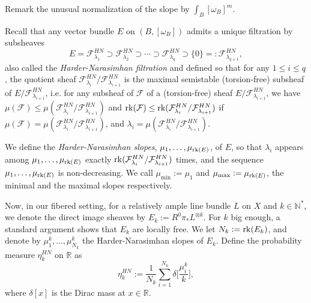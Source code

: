 \documentclass[12pt]{article}
\numberwithin{equation}{section}
\theoremstyle{theorem}
\theoremstyle{definition}
\theoremstyle{remark}
\newcommand{\real}{\mathbb{R}}
\newcommand{\nat}{\mathbb{N}}
\newcommand{\rk}[1]{{\rm{rk}} ( #1 )}
\begin{document}
	Remark the unusual normalization of the slope by $\int_B [\omega_B]^m$.
	\par 
	Recall that any vector bundle $E$ on $(B, [\omega_B])$ admits a unique filtration by subsheaves
	\begin{equation}\label{eq_HN_filt}
		E = \mathcal{F}^{HN}_{\lambda_1} \supset \mathcal{F}^{HN}_{\lambda_2} \supset \cdots \supset \mathcal{F}^{HN}_{\lambda_q} \supset \{0\} =: \mathcal{F}^{HN}_{\lambda_{q + 1}},
	\end{equation}
	also called the \textit{Harder-Narasimhan filtration} and defined so that for any $1 \leq i \leq q$, the quotient sheaf $\mathcal{F}^{HN}_{\lambda_i} / \mathcal{F}^{HN}_{\lambda_{i + 1}}$ is the maximal semistable (torsion-free) subsheaf of $E / \mathcal{F}^{HN}_{\lambda_{i + 1}}$, i.e. for any subsheaf of $\mathcal{F}$ of a (torsion-free) sheaf $E / \mathcal{F}^{HN}_{\lambda_{i + 1}}$, we have $\mu(\mathcal{F}) \leq \mu(\mathcal{F}^{HN}_{\lambda_i} / \mathcal{F}^{HN}_{\lambda_{i + 1}})$ and $\rk{\mathcal{F}} \leq \rk{\mathcal{F}^{HN}_{\lambda_i} / \mathcal{F}^{HN}_{\lambda_{i + 1}}}$ if $\mu(\mathcal{F}) = \mu(\mathcal{F}^{HN}_{\lambda_i} / \mathcal{F}^{HN}_{\lambda_{i + 1}})$, and $\lambda_i = \mu(\mathcal{F}^{HN}_{\lambda_i} / \mathcal{F}^{HN}_{\lambda_{i + 1}})$.
	\par 
	\begin{sloppypar}
	We define the \textit{Harder-Narasimhan slopes}, $\mu_1, \ldots, \mu_{\rk{E}}$, of $E$, so that $\lambda_i$ appears among $\mu_1, \ldots, \mu_{\rk{E}}$ exactly $\rk{\mathcal{F}^{HN}_{\lambda_i} / \mathcal{F}^{HN}_{\lambda_{i + 1}}}$ times, and the sequence $\mu_1, \ldots, \mu_{\rk{E}}$ is non-decreasing.
	We call $\mu_{\min} := \mu_1$ and $\mu_{\max} := \mu_{\rk{E}}$, the minimal and the maximal slopes respectively. 
	\end{sloppypar}
	\par
	Now, in our fibered setting, for a relatively ample line bundle $L$ on $X$ and $k \in \nat^*$, we denote the direct image sheaves by $E_k := R^0 \pi_* L^{\otimes k}$.
	For $k$ big enough, a standard argument shows that $E_k$ are locally free.
	We let $N_k := \rk{E_k}$, and denote by $\mu_1^k, \ldots, \mu_{N_k}^k$ the Harder-Narasimhan slopes of $E_k$.
	Define the probability measure $\eta_k^{HN}$ on $\real$ as
	\begin{equation}\label{eq_eta_defn}
		\eta_k^{HN} := \frac{1}{N_k} \sum_{i = 1}^{N_k} \delta \Big[ \frac{\mu_i^k}{k} \Big],
	\end{equation}
	where $\delta[x]$ is the Dirac mass at $x \in \real$. 
\end{document}

